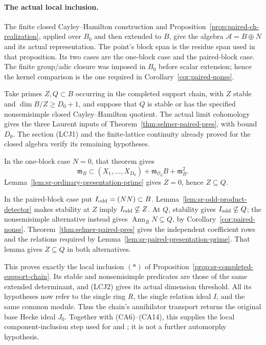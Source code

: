 \paragraph{The actual local inclusion.}
The finite closed Cayley--Hamilton construction and
Proposition~\ref{prop:paired-ch-realization}, applied over
\(B_0\) and then extended to \(B\), give the algebra
\(\mathcal A=B\oplus N\) and its actual representation.
The point's block span is the residue span used in that
proposition.  Its two cases are the one-block case and the
paired-block case.
The finite group/adic closure was imposed in \(B_0\) before
scalar extension; hence the kernel comparison is the one
required in Corollary~\ref{cor:paired-nonss}.

Take primes \(Z,Q\subset B\) occurring in the completed
support chain, with \(Z\) stable and
\(\dim B/Z\ge D_0+1\), and suppose that \(Q\) is stable or
has the specified nonsemisimple closed Cayley--Hamilton
quotient.
The actual limit cohomology gives the three Laurent inputs
of Theorem~\ref{thm:selmer-paired-pres}, with bound \(D_0\).
The section (LCJ1) and the finite-lattice continuity already
proved for the closed algebra verify its remaining hypotheses.

In the one-block case \(N=0\), that theorem gives
\[
 \mathfrak m_B\subset
   (X_1,\ldots,X_{D_0})+\mathfrak m_{\mathcal O_0}B+
                                      \mathfrak m_B^2 .
\]
Lemma~\ref{lem:sr-ordinary-presentation-prime} gives \(Z=0\),
hence \(Z\subseteq Q\).

In the paired-block case put \(I_{\rm odd}=(NN)\subset B\).
Lemma~\ref{lem:sr-odd-product-detector} makes stability at
\(Z\) imply \(I_{\rm odd}\not\subseteq Z\).
At \(Q\), stability gives \(I_{\rm odd}\not\subseteq Q\);
the nonsemisimple alternative instead gives
\(\operatorname{Ann}_B N\subseteq Q\), by
Corollary~\ref{cor:paired-nonss}.
Theorem~\ref{thm:selmer-paired-pres} gives the independent
coefficient rows and the relations required by
Lemma~\ref{lem:sr-paired-presentation-prime}.
That lemma gives \(Z\subseteq Q\) in both alternatives.

This proves exactly the local inclusion \((*)\) of
Proposition~\ref{prop:sr-completed-support-chain}.
Its stable and nonsemisimple predicates are those of the
same extended determinant, and (LCJ2) gives its actual
dimension threshold.
All its hypotheses now refer to the single ring \(R\), the
single relation ideal \(I\), and the same common module.
Thus the chain's annihilator transport returns the original
base Hecke ideal \(J_0\).
Together with (CA6)--(CA14), this supplies the local
component-inclusion step used for  and
; it is not a further automorphy hypothesis.
